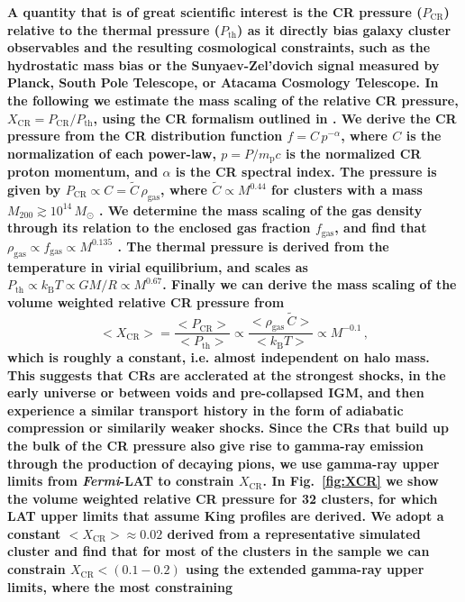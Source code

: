 \documentclass[10pt,aps,pra,reprint,amsmath,amsfonts,amssymb,showpacs,nofootinbib,floatfix]{revtex4-1}
\def\C#1{{\bf #1}}
\newcommand{\Fermi}{{\em Fermi}\xspace}
\newcommand{\rmn}{\mathrm}
\newcommand{\msun}{M_\odot}
\newcommand{\B}{\rmn{B}}
\newcommand{\CR}{\rmn{CR}}
\newcommand{\mvir}{M_{200}}
\begin{document}
\C{A quantity that is of great scientific interest is the CR pressure
  ($P_\CR$) relative to the thermal pressure ($P_\rmn{th}$) as it
  directly bias galaxy cluster observables and the resulting
  cosmological constraints, such as the hydrostatic mass bias or the
  Sunyaev-Zel’dovich signal measured by Planck, South Pole Telescope,
  or Atacama Cosmology Telescope. In the following we estimate the
  mass scaling of the relative CR pressure, $X_\CR =
  P_\CR/P_\rmn{th}$, using the CR formalism outlined in
  \cite{2007A&A...473...41E,2010MNRAS.409..449P}. We derive the CR
  pressure from the CR distribution function $f = C\,p^{-\alpha}$,
  where $C$ is the normalization of each power-law, $p=P/m_\rmn{p} c$
  is the normalized CR proton momentum, and $\alpha$ is the CR
  spectral index. The pressure is given by $P_\CR \propto
  C=\tilde{C} \,\rho_\rmn{gas}$, where $\tilde{C}\propto M^{0.44}$ for
  clusters with a mass $\mvir\gtrsim 10^{14}\,\msun$
  \cite{2010MNRAS.409..449P}. We determine the mass scaling of the gas
  density through its relation to the enclosed gas fraction
  $f_\rmn{gas}$, and find that $\rho_\rmn{gas}\propto f_\rmn{gas}
  \propto M^{0.135}$ \cite{2009ApJ...693.1142S}. The thermal pressure
  is derived from the temperature in virial equilibrium, and scales as
  $P_\rmn{th}\propto k_\B T \propto G M/R \propto M^{0.67}$. Finally
  we can derive the mass scaling of the volume weighted relative CR
  pressure from
\begin{equation}
 <X_\CR> = \frac{<P_\CR>}{<P_\rmn{th}>} \propto \frac{<\rho_\rmn{gas}\,
   \tilde{C}>}{<k_\B T>} \propto M^{-0.1}\,,
\end{equation}
which is roughly a constant, i.e. almost independent on halo
mass. This suggests that CRs are acclerated at the strongest shocks,
in the early universe or between voids and pre-collapsed IGM, and then
experience a similar transport history in the form of adiabatic
compression or similarily weaker shocks. Since the CRs that build up
the bulk of the CR pressure also give rise to gamma-ray emission
through the production of decaying pions, we use gamma-ray upper
limits from \Fermi-LAT to constrain $X_\CR$. In Fig.~\ref{fig:XCR} we
show the volume weighted relative CR pressure for 32 clusters, for
which LAT upper limits that assume King profiles are derived. We adopt
a constant $<X_\CR>\approx 0.02$ derived from a representative
simulated cluster \cite{2008MNRAS.385.1211P} and find that for most of
the clusters in the sample we can constrain $X_\CR < (0.1-0.2)$ using
the extended gamma-ray upper limits, where the most constraining
}
\end{document}
